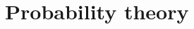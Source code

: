\chapter{Probability theory}\label{ch:probability_theory}


\begin{definition}\label{def:random_walk}
\end{definition}
